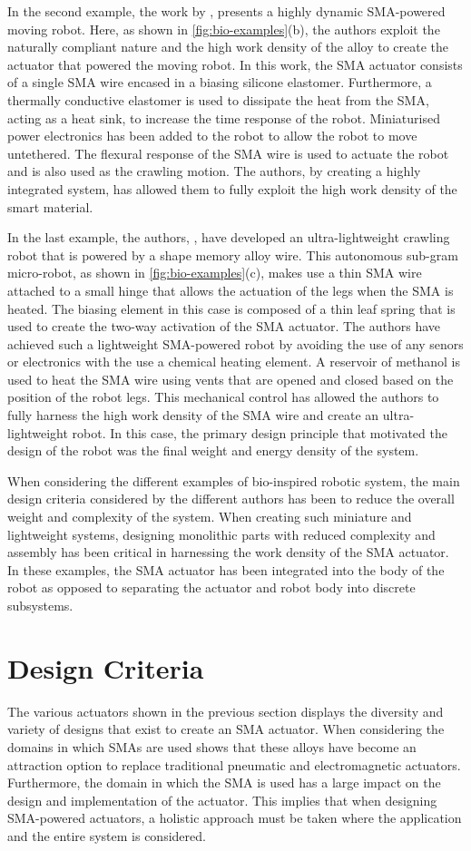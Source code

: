 In the second example, the work by \todocite, presents a highly dynamic SMA-powered moving robot. Here, as shown in \cref{fig:bio-examples}(b), the authors exploit the naturally compliant nature and the high work density of the alloy to create the actuator that powered the moving robot. In this work, the SMA actuator consists of a single SMA wire encased in a biasing silicone elastomer. Furthermore, a thermally conductive elastomer is used to dissipate the heat from the SMA, acting as a heat sink, to increase the time response of the robot. Miniaturised power electronics has been added to the robot to allow the robot to move untethered. The flexural response of the SMA wire is used to actuate the robot and is also used as the crawling motion. The authors, by creating a highly integrated system, has allowed them to fully exploit the high work density of the smart material.

In the last example, the authors, \todocite, have developed an ultra-lightweight crawling robot that is powered by a shape memory alloy wire. This autonomous sub-gram micro-robot, as shown in \cref{fig:bio-examples}(c), makes use a thin SMA wire attached to a small hinge that allows the actuation of the legs when the SMA is heated. The biasing element in this case is composed of a thin leaf spring that is used to create the two-way activation of the SMA actuator. The authors have achieved such a lightweight SMA-powered robot by avoiding the use of any senors or electronics with the use a chemical heating element. A reservoir of methanol is used to heat the SMA wire using vents that are opened and closed based on the position of the robot legs. This mechanical control has allowed the authors to fully harness the high work density of the SMA wire and create an ultra-lightweight robot. In this case, the primary design principle that motivated the design of the robot was the final weight and energy density of the system.

When considering the different examples of bio-inspired robotic system, the main design criteria considered by the different authors has been to reduce the overall weight and complexity of the system. When creating such miniature and lightweight systems, designing monolithic parts with reduced complexity and assembly has been critical in harnessing the work density of the SMA actuator. In these examples, the SMA actuator has been integrated into the body of the robot as opposed to separating the actuator and robot body into discrete subsystems.

\section{Design Criteria}
The various actuators shown in the previous section displays the diversity and variety of designs that exist to create an SMA actuator. When considering the domains in which SMAs are used shows that these alloys have become an attraction option to replace traditional pneumatic and electromagnetic actuators. Furthermore, the domain in which the SMA is used has a large impact on the design and implementation of the actuator. This implies that when designing SMA-powered actuators, a holistic approach must be taken where the application and the entire system is considered.

